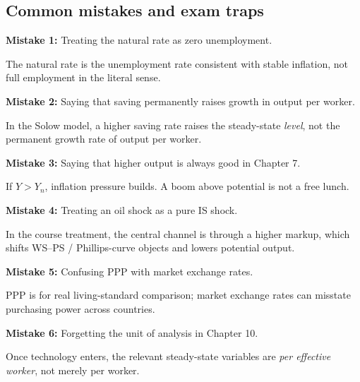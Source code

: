 \documentclass[12pt]{article}
\begin{document}
\subsection{Common mistakes and exam traps}

\begin{commonmistake}
\textbf{Mistake 1:} Treating the natural rate as zero unemployment.  

The natural rate is the unemployment rate consistent with stable inflation, not full employment in the literal sense.
\end{commonmistake}

\begin{commonmistake}
\textbf{Mistake 2:} Saying that saving permanently raises growth in output per worker.  

In the Solow model, a higher saving rate raises the steady-state \emph{level}, not the permanent growth rate of output per worker.
\end{commonmistake}

\begin{commonmistake}
\textbf{Mistake 3:} Saying that higher output is always good in Chapter 7.  

If $Y>Y_n$, inflation pressure builds. A boom above potential is not a free lunch.
\end{commonmistake}

\begin{commonmistake}
\textbf{Mistake 4:} Treating an oil shock as a pure IS shock.  

In the course treatment, the central channel is through a higher markup, which shifts WS--PS / Phillips-curve objects and lowers potential output.
\end{commonmistake}

\begin{commonmistake}
\textbf{Mistake 5:} Confusing PPP with market exchange rates.  

PPP is for real living-standard comparison; market exchange rates can misstate purchasing power across countries.
\end{commonmistake}

\begin{commonmistake}
\textbf{Mistake 6:} Forgetting the unit of analysis in Chapter 10.  

Once technology enters, the relevant steady-state variables are \emph{per effective worker}, not merely per worker.
\end{commonmistake}
\end{document}
